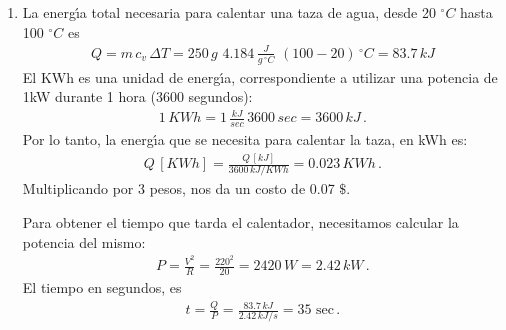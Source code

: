 \documentclass[a4paper,12pt]{article}
\begin{document}
\begin{enumerate}
\begin{enumerate}
\end{enumerate}
\vspace{1cm}
\item La energ\'{\i}a total necesaria para calentar una taza de 
agua, desde 20 $^\circ{C}$ hasta 100 $^\circ{C}$ es
\begin{eqnarray}
Q = m \, c_v \, \Delta T = 250 \, g \,\,  4.184 \, 
\frac{J}{g \, ^\circ{C}}   
\, \, (100 - 20) \, ^\circ{C}  = 83.7 \, kJ \nonumber 
\end{eqnarray}
El KWh es una unidad de energ\'{\i}a, correspondiente a utilizar 
una potencia de 1kW durante 1 hora (3600 segundos):
\begin{eqnarray}
1 \, KWh = 1 \, \frac{kJ}{sec} \, 3600 \, sec = 3600 \, kJ 
\nonumber \, .
\end{eqnarray}
Por lo tanto, la energ\'{\i}a que se necesita para calentar la taza, 
en kWh es:
\begin{eqnarray}
Q \, [KWh] = \frac{Q \, [kJ] }{3600 \, kJ/KWh} = 0.023 \, KWh \, . \nonumber
\end{eqnarray}
Multiplicando por 3 pesos, nos da un costo de 0.07 $\$$.

Para obtener el tiempo que tarda el calentador, necesitamos calcular 
la potencia del mismo:
\begin{eqnarray}
P = \frac{V^2}{R} = \frac{220^2}{20} = 2420 \, W = 2.42 \, kW 
\nonumber \, .
\end{eqnarray}
El tiempo en segundos, es 
\begin{eqnarray}
t = \frac{Q}{P} = \frac{83.7 \, kJ}{2.42 \, kJ/s} = 35 \,\, \mathrm{sec}
\nonumber \, .
\end{eqnarray}

\end{enumerate}
\end{document}
